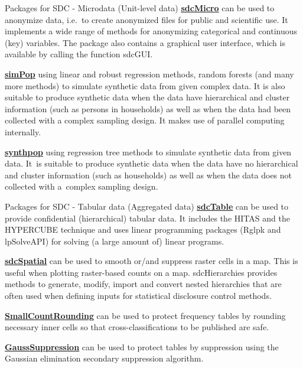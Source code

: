 \documentclass[
  ignorenonframetext,
  aspectratio=169,
]{beamer}
\begin{document}
\begin{frame}{Packages for SDC - Microdata (Unit-level data)}
\label{packages-for-sdc---microdata-unit-level-data}
\href{https://cran.r-project.org/web/packages/sdcMicro/index.html}{\color{blue}\underline{\textbf{sdcMicro}}}
can be used to anonymize data, i.e.~to create anonymized files for
public and scientific use. It implements a wide range of methods for
anonymizing categorical and continuous (key) variables. The package also
contains a graphical user interface, which is available by calling the
function sdcGUI.

\href{https://cran.r-project.org/web/packages/simPop/index.html}{\color{blue}\underline{\textbf{simPop}}}
using linear and robust regression methods, random forests (and many
more methods) to simulate synthetic data from given complex data. It is
also suitable to produce synthetic data when the data have hierarchical
and cluster information (such as persons in households) as well as when
the data had been collected with a complex sampling design. It makes use
of parallel computing internally.

\href{https://cran.r-project.org/web/packages/synthpop/index.html}{\color{blue}\underline{\textbf{synthpop}}}
using regression tree methods to simulate synthetic data from given
data. It~is suitable to produce synthetic data when the data have no
hierarchical and cluster information (such as households) as well as
when the data does not collected with a~complex sampling design.
\end{frame}

\begin{frame}{Packages for SDC - Tabular data (Aggregated data)}
\label{packages-for-sdc---tabular-data-aggregated-data}
\href{https://cran.r-project.org/web/packages/sdcTable/index.html}{\color{blue}\underline{\textbf{sdcTable}}}
can be used to provide confidential (hierarchical) tabular data. It
includes the HITAS and the HYPERCUBE technique and uses linear
programming packages (Rglpk and lpSolveAPI) for solving (a large amount
of) linear programs.

\href{https://cran.r-project.org/web/packages/sdcSpatial/index.html}{\color{blue}\underline{\textbf{sdcSpatial}}}
can be used to smooth or/and suppress raster cells in a map. This is
useful when plotting raster-based counts on a map. sdcHierarchies
provides methods to generate, modify, import and convert nested
hierarchies that are often used when defining inputs for statistical
disclosure control methods.

\href{https://cran.r-project.org/web/packages/SmallCountRounding/index.html}{\color{blue}\underline{\textbf{SmallCountRounding}}}
can be used to protect frequency tables by rounding necessary inner
cells so that cross-classifications to be published are safe.

\href{https://cran.r-project.org/web/packages/GaussSuppression/index.html}{\color{blue}\underline{\textbf{GaussSuppression}}}
can be used to protect tables by suppression using the Gaussian
elimination secondary suppression algorithm.
\end{frame}
\end{document}
